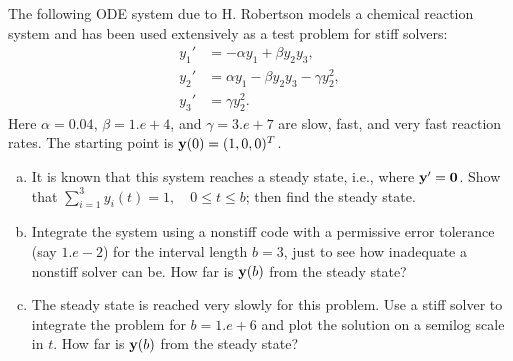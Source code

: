 \begin{problem}[A\&P 5.9]
  The following ODE system due to H. Robertson models a chemical reaction system and has been used extensively as a test problem for stiff solvers:
  \begin{align*}
    y_1' &= -\alpha y_1 + \beta y_2 y_3, \\
    y_2' &= \alpha y_1 - \beta y_2 y_3 - \gamma y_2^2, \\
    y_3' &= \gamma y_2^2.
  \end{align*}
  Here $\alpha = 0.04$, $\beta = 1.e + 4$, and $\gamma = 3.e + 7$ are slow, fast, and very fast reaction rates. The starting point is $\mathbf{y}(0) = (1,0,0)^T$.
  \begin{enumerate}[(a)]
    \item It is known that this system reaches a steady state, i.e., where $\mathbf{y}' = \mathbf{0}$. Show that $\sum_{i=1}^3 y_i(t) = 1,\quad 0 \leq t \leq b$; then find the steady state.
    \item Integrate the system using a nonstiff code with a permissive error tolerance (say $1.e - 2$) for the interval length $b = 3$, just to see how inadequate a nonstiff solver can be. How far is $\mathbf{y}(b)$ from the steady state?
    \item The steady state is reached very slowly for this problem. Use a stiff solver to integrate the problem for $b = 1.e + 6$ and plot the solution on a semilog scale in $t$. How far is $\mathbf{y}(b)$ from the steady state?
  \end{enumerate}
\end{problem}

\FloatBarrier

